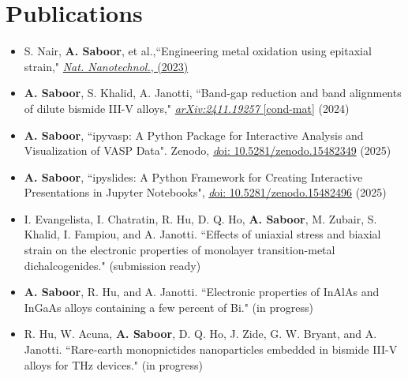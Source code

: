 \documentclass[letter,11pt]{article}
\begin{document}
\section{Publications}
\begin{itemize}
    \item S. Nair, \textbf{A. Saboor}, et al.,``Engineering metal oxidation using epitaxial strain," \href{https://www.nature.com/articles/s41565-023-01397-0}{\textit{Nat. Nanotechnol.}, (2023)}
    \item \textbf{A. Saboor}, S. Khalid, A. Janotti, ``Band-gap reduction and band alignments of dilute bismide III-V alloys," \href{https://arxiv.org/abs/2411.19257}{\textit{arXiv:2411.19257} [cond-mat]} (2024)
    \item \textbf{A. Saboor}, ``ipyvasp: A Python Package for Interactive Analysis and Visualization of VASP Data". Zenodo, \href{https://zenodo.org/records/15482349}{\textit doi: 10.5281/zenodo.15482349} (2025)
    \item \textbf{A. Saboor}, ``ipyslides: A Python Framework for Creating Interactive Presentations in Jupyter Notebooks", \href{https://zenodo.org/records/15482496}{\textit doi: 10.5281/zenodo.15482496} (2025)
    \item I. Evangelista, I. Chatratin, R. Hu, D. Q. Ho, \textbf{A. Saboor}, M. Zubair, S. Khalid, I. Fampiou, and A. Janotti. ``Effects of uniaxial stress and biaxial strain on the electronic properties of
        monolayer transition-metal dichalcogenides." (submission ready)
    \item \textbf{A. Saboor}, R. Hu, and A. Janotti. ``Electronic properties of InAlAs and InGaAs alloys
containing a few percent of Bi." (in progress)
    \item R. Hu, W. Acuna, \textbf{A. Saboor}, D. Q. Ho, J. Zide, G. W. Bryant, and A. Janotti. ``Rare-earth
monopnictides nanoparticles embedded in bismide III-V alloys for THz devices." (in
progress)
\end{itemize}
\end{document}

